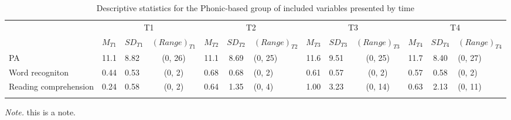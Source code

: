 \documentclass[
]{article}
\begin{document}
\begin{table}[tbp]

\begin{center}
\begin{threeparttable}

\caption{\label{tab:desc-read-PB-table}Descriptive statistics for the Phonic-based group of included variables presented by time}

\small{

\begin{tabular}{lclclclclclcl}
\toprule
 & \multicolumn{3}{c}{T1} & \multicolumn{3}{c}{T2} & \multicolumn{3}{c}{T3} & \multicolumn{3}{c}{T4} \\
\cmidrule(r){2-4} \cmidrule(r){5-7} \cmidrule(r){8-10} \cmidrule(r){11-13}
  & $M_{T1}$ & $SD_{T1}$ & $(Range)_{T1}$ & $M_{T2}$ & $SD_{T2}$ & $(Range)_{T2}$ & $M_{T3}$ & $SD_{T3}$ & $(Range)_{T3}$ & $M_{T4}$ & $SD_{T4}$ & $(Range)_{T4}$\\
\midrule
PA & 11.1 & 8.82 & (0, 26) & 11.1 & 8.69 & (0, 25) & 11.6 & 9.51 & (0, 25) & 11.7 & 8.40 & (0, 27)\\
Word recogniton & 0.44 & 0.53 & (0, 2) & 0.68 & 0.68 & (0, 2) & 0.61 & 0.57 & (0, 2) & 0.57 & 0.58 & (0, 2)\\
Reading comprehension & 0.24 & 0.58 & (0, 2) & 0.64 & 1.35 & (0, 4) & 1.00 & 3.23 & (0, 14) & 0.63 & 2.13 & (0, 11)\\
\bottomrule
\addlinespace
\end{tabular}

}

\begin{tablenotes}[para]
\normalsize{\textit{Note.} this is a note.}
\end{tablenotes}

\end{threeparttable}
\end{center}

\end{table}
\end{document}
